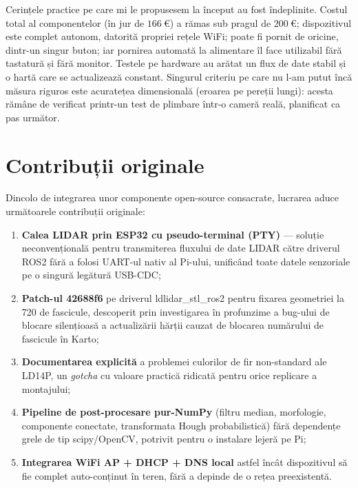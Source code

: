 \documentclass[a4paper,12pt,twoside,openany]{report}
\renewcommand{\texttt}[1]{\textnormal{#1}}
\begin{document}
Cerințele practice pe care mi le propusesem la început au fost îndeplinite.
Costul total al componentelor (în jur de $\SI{166}{\euro}$) a rămas sub pragul
de $\SI{200}{\euro}$; dispozitivul este complet autonom, datorită propriei
rețele WiFi; poate fi pornit de oricine, dintr-un singur buton; iar pornirea
automată la alimentare îl face utilizabil fără tastatură și fără monitor.
Testele pe hardware au arătat un flux de date stabil și o hartă care se
actualizează constant. Singurul criteriu pe care nu l-am putut încă măsura
riguros este acuratețea dimensională (eroarea pe pereții lungi): acesta rămâne
de verificat printr-un test de plimbare într-o cameră reală, planificat ca pas
următor.

\section{Contribuții originale}
\label{sec:contributions}

Dincolo de integrarea unor componente open-source consacrate, lucrarea
aduce următoarele contribuții originale:

\begin{enumerate}\itemsep0pt
    \item \textbf{Calea LIDAR prin ESP32 cu pseudo-terminal (PTY)} ---
          soluție neconvențională pentru transmiterea fluxului de date
          LIDAR către driverul ROS2 fără a folosi UART-ul nativ al Pi-ului,
          unificând toate datele senzoriale pe o singură legătură USB-CDC;
    \item \textbf{Patch-ul \texttt{42688f6}} pe driverul
          \texttt{ldlidar\_stl\_ros2} pentru fixarea geometriei la 720 de
          fascicule, descoperit prin investigarea în profunzime a bug-ului
          de blocare silențioasă a actualizării hărții cauzat de blocarea
          numărului de fascicule în Karto;
    \item \textbf{Documentarea explicită} a problemei culorilor de fir
          non-standard ale LD14P, un \textit{gotcha} cu valoare practică
          ridicată pentru orice replicare a montajului;
    \item \textbf{Pipeline de post-procesare pur-NumPy} (filtru median,
          morfologie, componente conectate, transformata Hough
          probabilistică) fără dependențe grele de tip scipy/OpenCV,
          potrivit pentru o instalare lejeră pe Pi;
    \item \textbf{Integrarea WiFi AP + DHCP + DNS local} astfel încât
          dispozitivul să fie complet auto-conținut în teren, fără a depinde
          de o rețea preexistentă.
\end{enumerate}
\end{document}
